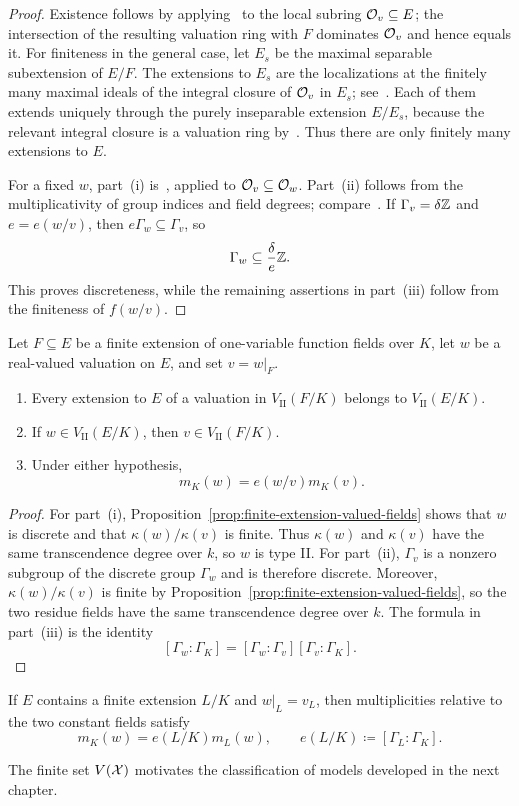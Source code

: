 \begin{proof}
    Existence follows by applying~\cite[\href{https://stacks.math.columbia.edu/tag/00IA}{Lemma 10.50.2}]{Stacks} to the local subring $\mathcal{O}_v\subseteq E$; the intersection of the resulting valuation ring with $F$ dominates $\mathcal{O}_v$ and hence equals it.
    For finiteness in the general case, let $E_s$ be the maximal separable subextension of $E/F$.
    The extensions to $E_s$ are the localizations at the finitely many maximal ideals of the integral closure of $\mathcal{O}_v$ in $E_s$; see~\cite[\href{https://stacks.math.columbia.edu/tag/0EXQ}{Remark 15.113.6}]{Stacks}.
    Each of them extends uniquely through the purely inseparable extension $E/E_s$, because the relevant integral closure is a valuation ring by~\cite[\href{https://stacks.math.columbia.edu/tag/0H37}{Lemma 15.123.3}]{Stacks}.
    Thus there are only finitely many extensions to $E$.

    For a fixed $w$, part~(i) is~\cite[\href{https://stacks.math.columbia.edu/tag/0ASH}{Lemma 15.125.2}]{Stacks}, applied to $\mathcal{O}_v\subseteq\mathcal{O}_w$.
    Part~(ii) follows from the multiplicativity of group indices and field degrees; compare~\cite[\href{https://stacks.math.columbia.edu/tag/0BRL}{Lemma 15.113.3}]{Stacks}.
    If $\Gamma_v=\delta\mathbb Z$ and $e=e(w/v)$, then $e\Gamma_w\subseteq\Gamma_v$, so
    \[
        \Gamma_w\subseteq\frac{\delta}{e}\mathbb Z.
    \]
    This proves discreteness, while the remaining assertions in part~(iii) follow from the finiteness of $f(w/v)$.
\end{proof}

\begin{corollary}\label{cor:finite-extensions-type-II-valuations}
    Let $F\subseteq E$ be a finite extension of one-variable function fields over $K$, let $w$ be a real-valued valuation on $E$, and set $v=w|_F$.
    \begin{enumerate}[label=\textup{(\roman*)}]
        \item Every extension to $E$ of a valuation in $V_\mathrm{II}(F/K)$ belongs to $V_\mathrm{II}(E/K)$.
        \item If $w\in V_\mathrm{II}(E/K)$, then $v\in V_\mathrm{II}(F/K)$.
        \item Under either hypothesis,
        \[
            m_K(w)=e(w/v)m_K(v).
        \]
    \end{enumerate}
\end{corollary}

\begin{proof}
    For part~(i), Proposition~\ref{prop:finite-extension-valued-fields} shows that $w$ is discrete and that $\kappa(w)/\kappa(v)$ is finite.
    Thus $\kappa(w)$ and $\kappa(v)$ have the same transcendence degree over $k$, so $w$ is type II.
    For part~(ii), $\Gamma_v$ is a nonzero subgroup of the discrete group $\Gamma_w$ and is therefore discrete.
    Moreover, $\kappa(w)/\kappa(v)$ is finite by Proposition~\ref{prop:finite-extension-valued-fields}, so the two residue fields have the same transcendence degree over $k$.
    The formula in part~(iii) is the identity
    \[
        [\Gamma_w:\Gamma_K]
        =
        [\Gamma_w:\Gamma_v][\Gamma_v:\Gamma_K].
    \]
\end{proof}

If $E$ contains a finite extension $L/K$ and $w|_L=v_L$, then multiplicities relative to the two constant fields satisfy
\[
    m_K(w)=e(L/K)m_L(w),
    \qquad
    e(L/K)\coloneqq[\Gamma_L:\Gamma_K].
\]

The finite set $V(\mathcal X)$ motivates the classification of models developed in the next chapter.
